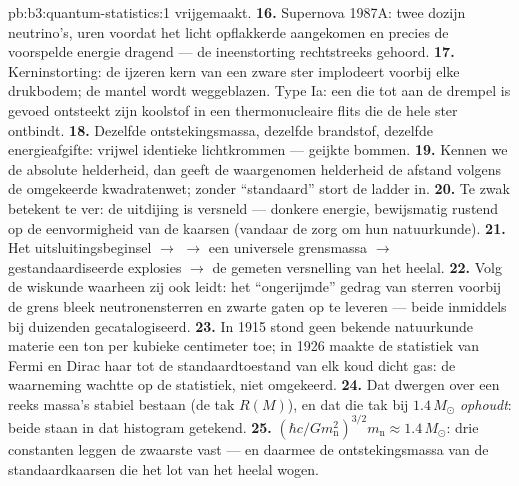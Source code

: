 \begin{solution}{pb:b3:quantum-statistics:1}
vrijgemaakt.
\textbf{16.} Supernova 1987A: twee dozijn neutrino's, uren voordat het
licht opflakkerde aangekomen en precies de voorspelde energie dragend ---
de ineenstorting rechtstreeks gehoord.
\textbf{17.} Kerninstorting: de ijzeren kern van een zware ster implodeert
voorbij elke drukbodem; de mantel wordt weggeblazen. Type Ia: een  die tot aan de drempel is gevoed ontsteekt zijn koolstof in een
thermonucleaire flits die de hele ster ontbindt.
\textbf{18.} Dezelfde ontstekingsmassa, dezelfde brandstof, dezelfde
energieafgifte: vrijwel identieke lichtkrommen --- geijkte bommen.
\textbf{19.} Kennen we de absolute helderheid, dan geeft de waargenomen
helderheid de afstand volgens de omgekeerde kwadratenwet; zonder
``standaard'' stort de ladder in.
\textbf{20.} Te zwak betekent te ver: de uitdijing is versneld --- donkere
energie, bewijsmatig rustend op de eenvormigheid van de kaarsen (vandaar
de zorg om hun natuurkunde).
\textbf{21.} Het uitsluitingsbeginsel $\to$  $\to$ een
universele grensmassa $\to$ gestandaardiseerde explosies $\to$ de gemeten
versnelling van het heelal.
\textbf{22.} Volg de wiskunde waarheen zij ook leidt: het ``ongerijmde''
gedrag van sterren voorbij de grens bleek neutronensterren en zwarte gaten
op te leveren --- beide inmiddels bij duizenden gecatalogiseerd.
\textbf{23.} In 1915 stond geen bekende natuurkunde materie een ton per
kubieke centimeter toe; in 1926 maakte de statistiek van Fermi en Dirac
haar tot de standaardtoestand van elk koud dicht gas: de waarneming
wachtte op de statistiek, niet omgekeerd.
\textbf{24.} Dat dwergen over een reeks massa's stabiel bestaan (de tak
$R(M)$), en dat die tak bij $1.4\,M_\odot$ \emph{ophoudt}: beide staan in
dat histogram getekend.
\textbf{25.} $(\hbar c/Gm_{\text{n}}^2)^{3/2}m_{\text{n}} \approx
1.4\,M_\odot$: drie constanten leggen de zwaarste  vast --- en
daarmee de ontstekingsmassa van de standaardkaarsen die het lot van het
heelal wogen.
\end{solution}
